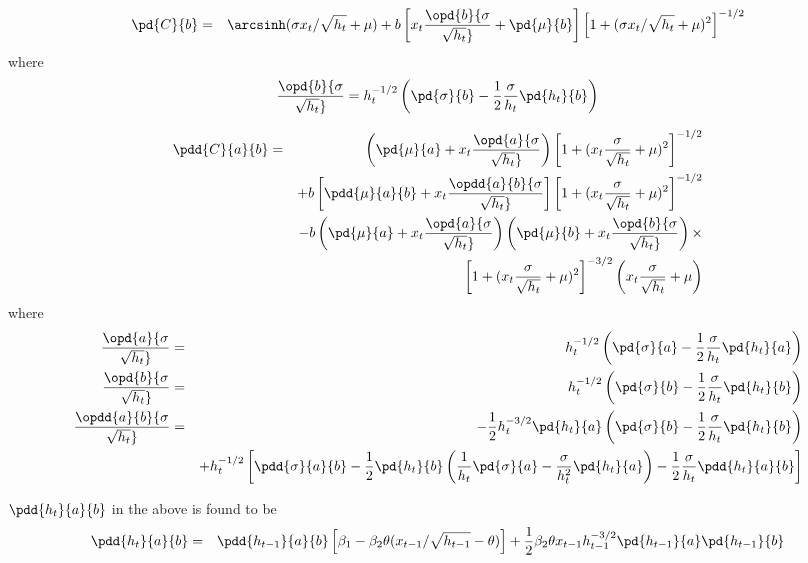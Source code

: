 \documentclass{book}
\begin{document}
\begin{enumerate}
  \begin{eqnarray*}
    \pd{C}{b} &=& \arcsinh(\sigma x_t / \sqrt{h_t} + \mu) + b \left[
      x_t \opd{b} {\sigma \over \sqrt{h_t}} + \pd{\mu}{b}
    \right] \left[
      1 + (\sigma x_t / \sqrt{h_t} + \mu)^2
    \right]^{-1/2}
  \end{eqnarray*}
  where
  \begin{equation*}
    \opd{b} {\sigma \over \sqrt{h_t}} = h_t^{-1/2} \left(
      \pd{\sigma}{b} - {1 \over 2} {\sigma \over h_t} \pd{h_t}{b}
    \right)
  \end{equation*}

  \begin{eqnarray*}
    \pdd{C}{a}{b} &=& \left(
      \pd{\mu}{a} + x_t \opd{a} {\sigma \over \sqrt{h_t}}
    \right) \left[ 1 + (x_t {\sigma \over \sqrt{h_t}} + \mu)^2 \right]^{-1/2} \\
    &&
    + b \left[
      \pdd{\mu}{a}{b} + x_t \opdd{a}{b} {\sigma \over \sqrt{h_t}}
    \right] \left[ 1 + (x_t {\sigma \over \sqrt{h_t}} + \mu)^2 \right]^{-1/2} \\
    &&
    - b \left( \pd{\mu}{a} + x_t \opd{a} {\sigma \over \sqrt{h_t}}
    \right) \left( \pd{\mu}{b} + x_t \opd{b} {\sigma \over \sqrt{h_t}}
    \right)  \times \\
    &&
    \left[ 1 + (x_t {\sigma \over \sqrt{h_t}} + \mu)^2 \right]^{-3/2}
    \left( x_t {\sigma \over \sqrt{h_t}} + \mu \right) 
  \end{eqnarray*}
  where
  \begin{eqnarray*}
    \opd{a} {\sigma \over \sqrt{h_t}} &=& h_t^{-1/2} \left(
      \pd{\sigma}{a} - {1 \over 2}{\sigma \over h_t}\pd{h_t}{a}
    \right) \\
    \opd{b} {\sigma \over \sqrt{h_t}} &=& h_t^{-1/2} \left(
      \pd{\sigma}{b} - {1 \over 2}{\sigma \over h_t}\pd{h_t}{b}
    \right) \\
    \opdd{a}{b} {\sigma \over \sqrt{h_t}} &=& -{1 \over 2}h_t^{-3/2} \pd{h_t}{a} \left(
      \pd{\sigma}{b} - {1 \over 2}{\sigma \over h_t}\pd{h_t}{b}
    \right) \\
    && + h_t^{-1/2} \left[
      \pdd{\sigma}{a}{b} - {1 \over 2} \pd{h_t}{b} \left(
        {1 \over h_t} \pd{\sigma}{a} - {\sigma \over h_t^2} \pd{h_t}{a}
        \right) - {1 \over 2} {\sigma \over h_t} \pdd{h_t}{a}{b}
    \right]
  \end{eqnarray*}

  $\pdd{h_t}{a}{b}$ in the above is found to be
  \begin{eqnarray*}
    \pdd{h_t}{a}{b} &=&
    \pdd{h_{t-1}}{a}{b} \left[
      \beta_1 - \beta_2 \theta (x_{t-1}/\sqrt{h_{t-1}} - \theta)
    \right] + {1 \over 2} \beta_2 \theta x_{t-1} h_{t-1}^{-3/2}
    \pd{h_{t-1}}{a} \pd{h_{t-1}}{b}
  \end{eqnarray*}


\end{enumerate}
\end{document}
